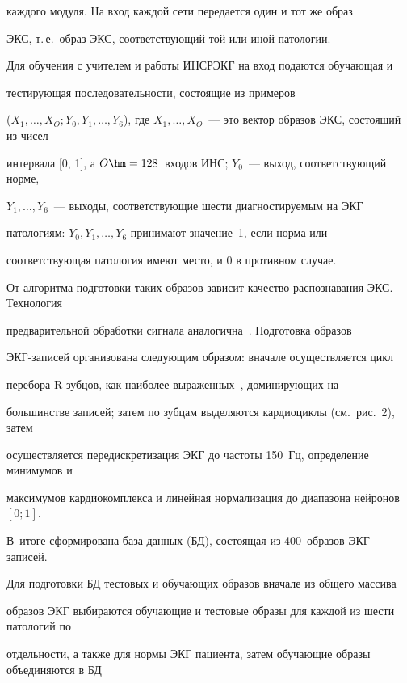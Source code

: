 каждого модуля. На вход каждой сети передается один и тот же образ


ЭКС, т.\,е.\ образ ЭКС, соответствующий той или иной патологии.





 Для обучения с учителем и работы ИНСРЭКГ на вход подаются обуча\-ющая и


тестирующая последовательности, состоящие из примеров


($X_1, \ldots , X_O; Y_0, Y_1,


\ldots , Y_6$), где $X_1,\ldots , X_O$~--- это вектор образов ЭКС, состоящий из чисел


интервала [0, 1], а $O\hm= 128$~входов ИНС; $Y_0$~--- выход, соответствующий норме,


$Y_1, \ldots , Y_6$~--- выходы, соответствующие шести диагностируемым на ЭКГ


патологиям: $Y_0, Y_1, \ldots , Y_6$ принимают значение~1, если норма или


соответствующая патология имеют место, и 0 в противном случае.





 От алгоритма подготовки таких образов зависит качество распознавания ЭКС. Технология


предварительной обработки сигнала аналогична~\cite{7-kir}. Подготовка образов


 ЭКГ-за\-пи\-сей организована следующим образом: вначале осуществляется цикл


перебора {R}-зуб\-цов, как наиболее выраженных~\cite{5-kir}, доминирующих на


большинстве записей; затем по зубцам выделяются кардиоциклы (см.\ рис.~2), затем


осуществляется передискретизация ЭКГ до частоты 150~Гц, определение минимумов и


максимумов кардиокомплекса и линейная нормализация до диапазона нейронов $[0; 1]$.


В~итоге сформирована база данных (БД), состоящая из 400~образов ЭКГ-за\-писей.





 Для подготовки БД тестовых и обучающих образов вначале из общего массива


образов ЭКГ выбираются обучающие и тестовые образы для каждой из шести патологий по


отдельности, а также для нормы ЭКГ пациента, затем обучающие образы объединяются в БД



